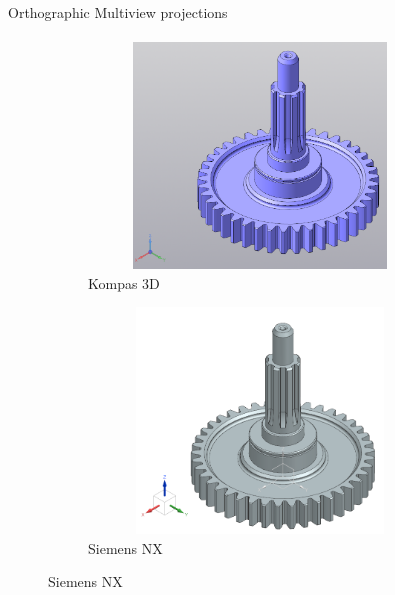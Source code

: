 \documentclass[aspectratio=169]{beamer}
\begin{document}
\begin{frame}[t]{Orthographic Multiview projections}
    \framesubtitle{}
    \vspace{-0.6cm}
    \begin{figure}[H]
        \begin{subfigure}{0.49\textwidth}
            \centering\includegraphics[height=6cm,width=1\textwidth,keepaspectratio]{resources/kompas_1.png}
            \caption*{Kompas 3D}
            \label{fig:resources/kompas_1.png}
        \end{subfigure}
        \begin{subfigure}{0.49\textwidth}
            \centering\includegraphics[height=6cm,width=1\textwidth,keepaspectratio]{resources/nx_1.png}
            \caption*{Siemens NX}
            \label{fig:resources/nx_1.png}
        \end{subfigure}
    \end{figure}
\end{frame}
\end{document}
